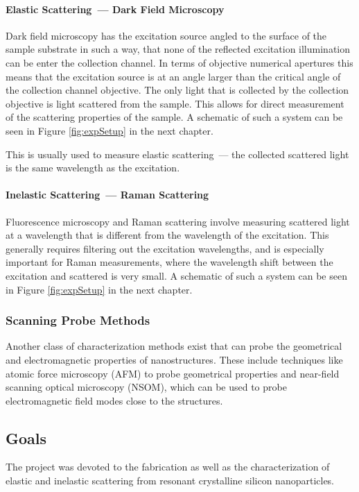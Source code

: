             \paragraph{Elastic Scattering~--- Dark Field Microscopy}
                    Dark field microscopy has the excitation source angled to the surface of the sample substrate in such a way, that none of
                the reflected excitation illumination can be enter the collection channel. In terms of objective numerical apertures this
                means that the excitation source is at an angle larger than the critical angle of the collection channel objective. The only
                light that is collected by the collection objective is light scattered from the sample. This allows for direct measurement of
                the scattering properties of the sample. A schematic of such a system can be seen in Figure \ref{fig:expSetup} in the next chapter.

                    This is usually used to measure elastic scattering~--- the collected scattered light is the same wavelength as the excitation.
            \paragraph{Inelastic Scattering~--- Raman Scattering}
                    Fluorescence microscopy and Raman scattering involve measuring scattered light at a wavelength that is different from the
                wavelength of the excitation. This generally requires filtering out the excitation wavelengths, and is especially
                important for Raman measurements, where the wavelength shift between the excitation and scattered is very small.
                A schematic of such a system can be seen in Figure \ref{fig:expSetup} in the next chapter.

        \subsubsection{Scanning Probe Methods}
        \label{sec:SPM}
                Another class of characterization methods exist that can probe the geometrical and electromagnetic properties of nanostructures.
            These include techniques like atomic force microscopy (AFM) to probe geometrical properties and near-field scanning
            optical microscopy (NSOM), which can be used to probe electromagnetic field modes close to the structures.
    \clearpage
    \subsection{Goals}
            The project was devoted to the fabrication as well as the characterization of elastic and inelastic scattering from resonant crystalline
        silicon nanoparticles.

